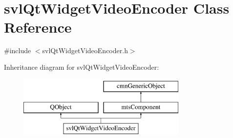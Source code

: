 \hypertarget{classsvl_qt_widget_video_encoder}{}\section{svl\+Qt\+Widget\+Video\+Encoder Class Reference}
\label{classsvl_qt_widget_video_encoder}


{\ttfamily \#include $<$svl\+Qt\+Widget\+Video\+Encoder.\+h$>$}

Inheritance diagram for svl\+Qt\+Widget\+Video\+Encoder\+:\begin{figure}[H]
\begin{center}
\leavevmode
\includegraphics[height=3.000000cm]{d8/da0/classsvl_qt_widget_video_encoder}
\end{center}
\end{figure}
